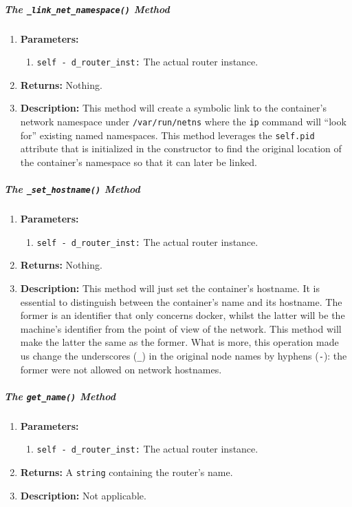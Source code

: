         \subparagraph{The \texttt{\_link\_net\_namespace()} Method}
            \begin{enumerate}
                \item \textbf{Parameters:}
                \begin{enumerate}
                    \item \texttt{self - d\_router\_inst:} The actual router instance.
                \end{enumerate}
                \item \textbf{Returns:} Nothing.
                \item \textbf{Description:} This method will create a symbolic link to the container's network namespace under \texttt{/var/run/netns} where the \texttt{ip} command will ``look for'' existing named namespaces. This method leverages the \texttt{self.pid} attribute that is initialized in the constructor to find the original location of the container's namespace so that it can later be linked.
            \end{enumerate}

        \subparagraph{The \texttt{\_set\_hostname()} Method}
            \begin{enumerate}
                \item \textbf{Parameters:}
                \begin{enumerate}
                    \item \texttt{self - d\_router\_inst:} The actual router instance.
                \end{enumerate}
                \item \textbf{Returns:} Nothing.
                \item \textbf{Description:} This method will just set the container's hostname. It is essential to distinguish between the container's name and its hostname. The former is an identifier that only concerns docker, whilst the latter will be the machine's identifier from the point of view of the network. This method will make the latter the same as the former. What is more, this operation made us change the underscores (\texttt{\_}) in the original node names by hyphens (\texttt{-}): the former were not allowed on network hostnames.
            \end{enumerate}

        \subparagraph{The \texttt{get\_name()} Method}
            \begin{enumerate}
                \item \textbf{Parameters:}
                \begin{enumerate}
                    \item \texttt{self - d\_router\_inst:} The actual router instance.
                \end{enumerate}
                \item \textbf{Returns:} A \texttt{string} containing the router's name.
                \item \textbf{Description:} Not applicable.
            \end{enumerate}

